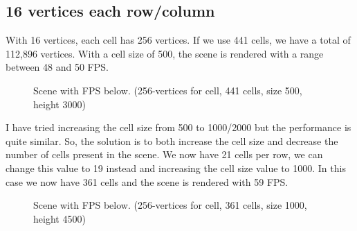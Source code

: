 \subsection{16 vertices each row/column}
With 16 vertices, each cell has 256 vertices. If we use 441 cells, we have a total of 112,896 vertices. With a cell size of 500, the scene is rendered with a range between 48 and 50 FPS.

\newpage

\begin{figure}[hbt!]
	\centering
	
	\noindent{}
	
	\caption{Scene with FPS below. (256-vertices for cell, 441 cells, size 500, height 3000)}
\end{figure} 

\noindent
I have tried increasing the cell size from 500 to 1000/2000 but the performance is quite similar. So, the solution is to both increase the cell size and decrease the number of cells present in the scene. We now have 21 cells per row, we can change this value to 19 instead and increasing the cell size value to 1000. In this case we now have 361 cells and the scene is rendered with 59 FPS.

\newpage

\begin{figure}[hbt!]
	\centering
	
	\noindent{}
	
	\caption{Scene with FPS below. (256-vertices for cell, 361 cells, size 1000, height 4500)}
\end{figure} 

